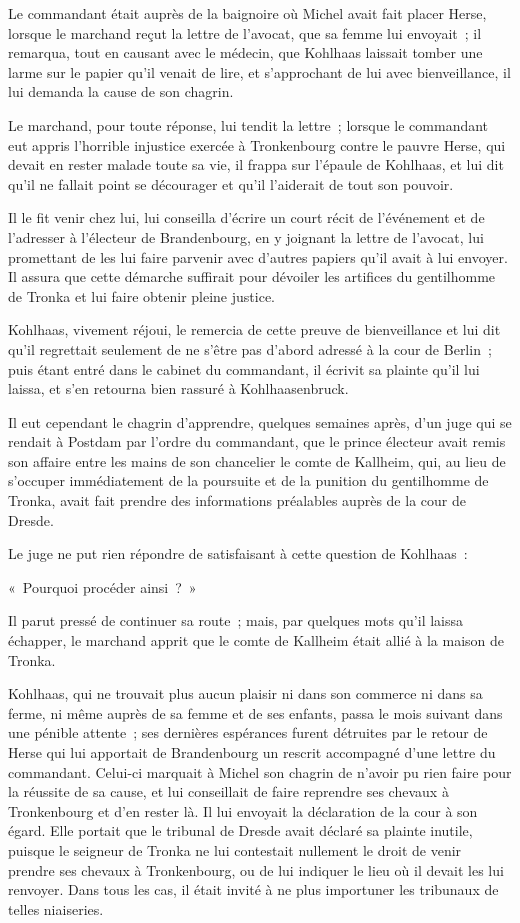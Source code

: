 \documentclass[french,twoside]{book} %
\begin{document}
Le commandant était auprès de la baignoire où Michel avait fait placer Herse, lorsque le marchand reçut la lettre de l’avocat, que sa femme lui envoyait ; il remarqua, tout en causant avec le médecin, que Kohlhaas laissait tomber une larme sur le papier qu’il venait de lire, et s’approchant de lui avec bienveillance, il lui demanda la cause de son chagrin.\par
Le marchand, pour toute réponse, lui tendit la lettre ; lorsque le commandant eut appris l’horrible injustice exercée à Tronkenbourg contre le pauvre Herse, qui devait en rester malade toute sa vie, il frappa sur l’épaule de Kohlhaas, et lui dit qu’il ne fallait point se décourager et qu’il l’aiderait de tout son pouvoir.\par
Il le fit venir chez lui, lui conseilla d’écrire un court récit de l’événement et de l’adresser à l’électeur de Brandenbourg, en y joignant la lettre de l’avocat, lui promettant de les lui faire parvenir avec d’autres papiers qu’il avait à lui envoyer. Il assura que cette démarche suffirait pour dévoiler les artifices du gentilhomme de Tronka et lui faire obtenir pleine justice.\par
Kohlhaas, vivement réjoui, le remercia de cette preuve de bienveillance et lui dit qu’il regrettait seulement de ne s’être pas d’abord adressé à la cour de Berlin ; puis étant entré dans le cabinet du commandant, il écrivit sa plainte qu’il lui laissa, et s’en retourna bien rassuré à Kohlhaasenbruck.\par
Il eut cependant le chagrin d’apprendre, quelques semaines après, d’un juge qui se rendait à Postdam par l’ordre du commandant, que le prince électeur avait remis son affaire entre les mains de son chancelier le comte de Kallheim, qui, au lieu de s’occuper immédiatement de la poursuite et de la punition du gentilhomme de Tronka, avait fait prendre des informations préalables auprès de la cour de Dresde.\par
Le juge ne put rien répondre de satisfaisant à cette question de Kohlhaas :\par
« Pourquoi procéder ainsi ? »\par
Il parut pressé de continuer sa route ; mais, par quelques mots qu’il laissa échapper, le marchand apprit que le comte de Kallheim était allié à la maison de Tronka.\par
Kohlhaas, qui ne trouvait plus aucun plaisir ni dans son commerce ni dans sa ferme, ni même auprès de sa femme et de ses enfants, passa le mois suivant dans une pénible attente ; ses dernières espérances furent détruites par le retour de Herse qui lui apportait de Brandenbourg un rescrit accompagné d’une lettre du commandant. Celui-ci marquait à Michel son chagrin de n’avoir pu rien faire pour la réussite de sa cause, et lui conseillait de faire reprendre ses chevaux à Tronkenbourg et d’en rester là. Il lui envoyait la déclaration de la cour à son égard. Elle portait que le tribunal de Dresde avait déclaré sa plainte inutile, puisque le seigneur de Tronka ne lui contestait nullement le droit de venir prendre ses chevaux à Tronkenbourg, ou de lui indiquer le lieu où il devait les lui renvoyer. Dans tous les cas, il était invité à ne plus importuner les tribunaux de telles niaiseries.\par
\end{document}
